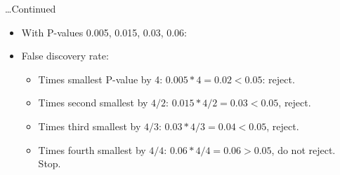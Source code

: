 \documentclass[
  ignorenonframetext,
]{beamer}
\begin{document}
\begin{frame}{\ldots Continued}
\protect\hypertarget{continued}{}
\begin{itemize}
\item
  With P-values 0.005, 0.015, 0.03, 0.06:
\item
  False discovery rate:

  \begin{itemize}
  \item
    Times smallest P-value by 4: \(0.005*4=0.02<0.05\): reject.
  \item
    Times second smallest by \(4/2\): \(0.015*4/2=0.03<0.05\), reject.
  \item
    Times third smallest by \(4/3\): \(0.03*4/3=0.04<0.05\), reject.
  \item
    Times fourth smallest by \(4/4\): \(0.06*4/4=0.06>0.05\), do not
    reject. Stop.
  \end{itemize}
\end{itemize}
\end{frame}
\end{document}
